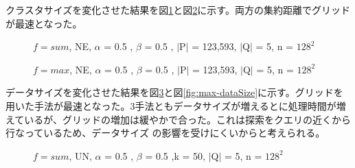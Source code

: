 \documentclass{deimj}
\theoremstyle{definition}
\begin{document}
クラスタサイズを変化させた結果を図\ref{fig:sum-clusterSize}と図\ref{fig:max-clusterSize}に示す。両方の集約距離でグリッドが最速となった。

\begin{figure}[H]
	\centering
    \caption{$f=sum$, NE, $\alpha$ = 0.5 , $\beta$ = 0.5 , $\mid$P$\mid$ = 123,593, $\mid$Q$\mid$ = 5, n = $128^2$}
    \label{fig:sum-clusterSize}
\end{figure}

\begin{figure}[H]
	\centering
    \caption{$f=max$, NE, $\alpha$ = 0.5 , $\beta$ = 0.5 , $\mid$P$\mid$ = 123,593, $\mid$Q$\mid$ = 5, n = $128^2$}
    \label{fig:max-clusterSize}
\end{figure}

データサイズを変化させた結果を図\ref{fig:sum-dataSize}と図\ref{fig:max-dataSize}に示す。グリッドを用いた手法が最速となった。3手法ともデータサイズが増えるとに処理時間が増えているが、グリッドの増加は緩やかで合った。これは探索をクエリの近くから行なっているため、データサイズ の影響を受けにくいからと考えられる。

\begin{figure}[H]
	\centering
    \caption{$f=sum$, UN, $\alpha$ = 0.5 , $\beta$ = 0.5 ,k = 50, $\mid$Q$\mid$ = 5, n = $128^2$}
    \label{fig:sum-dataSize}
\end{figure}
\end{document}

